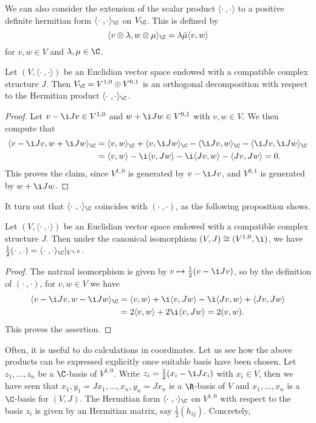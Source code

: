 We can also consider the extension of the scalar product $\langle\cdot\ ,\cdot\rangle$ to a positive definite hermitian form $\langle\cdot\ ,\cdot\rangle_{\C}$ on $V_{\C}$. This is defined by
\[\langle v\otimes\lambda,w\otimes\mu\rangle_{\C}=\lambda\bar{\mu}\langle v,w\rangle\]
for $v,w\in V$ and $\lambda,\mu\in\C$.
\begin{proposition}\label{almost complex space decomposition of V_C}
Let $(V,\langle\cdot\ ,\cdot\rangle)$ be an Euclidian vector space endowed with a compatible complex structure $J$. Then $V_{\C}=V^{1,0}\oplus V^{0,1}$ is an orthogonal decomposition with respect to the Hermitian product $\langle\cdot\ ,\cdot\rangle_{\C}$.
\end{proposition}
\begin{proof}
Let $v-\i Jv\in V^{1,0}$ and $w+\i Jw\in V^{0,1}$ with $v,w\in V$. We then compute that
\begin{align*}
\langle v-\i Jv,w+\i Jw\rangle_{\C}&=\langle v,w\rangle_{\C}+\langle v,\i Jw\rangle_{\C}-\langle\i Jv,w\rangle_{\C}-\langle\i Jv,\i Jw\rangle_{\C}\\
&=\langle v,w\rangle-\i\langle v,Jw\rangle-\i\langle Jv,w\rangle-\langle Jv,Jw\rangle=0.
\end{align*}
This proves the claim, since $V^{1,0}$ is generated by $v-\i Jv$, and $V^{0,1}$ is generated by $w+\i Jw$.
\end{proof}
It turn out that $\langle\cdot\ ,\cdot\rangle_{\C}$ coincides with $(\cdot\ ,\cdot)$, as the following proposition shows.
\begin{proposition}\label{almost complex space Hermitian form relation}
Let $(V,\langle\cdot\ ,\cdot\rangle)$ be an Euclidian vector space endowed with a compatible complex structure $J$. Then under the canonical isomorphism $(V,J)\cong (V^{1,0},\i)$, we have $\frac{1}{2}(\cdot\ ,\cdot)=\langle\cdot\ ,\cdot\rangle_{\C}|_{V^{1,0}}$.
\end{proposition}
\begin{proof}
The natrual isomorphism is given by $v\mapsto\frac{1}{2}(v-\i Jv)$, so by the definition of $(\cdot\ ,\cdot)$, for $v,w\in V$ we have
\begin{align*}
\langle v-\i Jv,w-\i Jw\rangle_{\C}&=\langle v,w\rangle+\i\langle v,Jw\rangle-\i\langle Jv,w\rangle+\langle Jv,Jw\rangle\\
&=2\langle v,w\rangle+2\i\langle v,Jw\rangle=2(v,w).
\end{align*}
This proves the assertion.
\end{proof}
Often, it is useful to do calculations in coordinates. Let us see how the above products can be expressed explicitly once suitable basis have been chosen. Let $z_1,\dots,z_n$ be a $\C$-basis of $V^{1,0}$. Write $z_i=\frac{1}{2}(x_i-\i Jx_i)$ with $x_i\in V$, then we have seen that $x_1,y_1=Jx_1,\dots,x_n,y_n=Jx_n$ is a $\R$-basis of $V$ and $x_1,\dots,x_n$ is a $\C$-basis for $(V,J)$. The Hermitian form $\langle\cdot\ ,\cdot\rangle_{\C}$ on $V^{1,0}$ with respect to the basis $z_i$ is given by an Hermitian matrix, say $\frac{1}{2}(h_{ij})$. Concretely,
